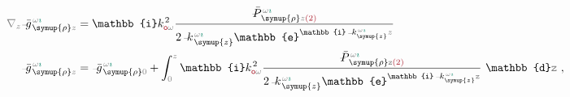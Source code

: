 \begin{subequations} \label{eq:simplify7-LE0-SVA-V_1singular-nokxky-zeta}
\begin{align}
	\mathcolor{gray}{\nabla_z} \xint{{}^{}_{\mathcolor{gray}{-}}}{10}{\bar{g}}^{\;\!\mathcolor{gray}{\omega} \textcolor{PineGreen}{\imath}}_{\;\! \symup{\rho} \mathcolor{gray}{z}} &= \mathbb{i} k_{\textcolor{Maroon}{\mathsf{o}} \mathcolor{gray}{\omega}}^{\;\! 2} \frac{\xint{\mathcolor{gray}{-}}{25}{\bar{P}}^{\;\! \mathcolor{gray}{\omega} \textcolor{PineGreen}{\imath}}_{\;\! \symup{\rho} \mathcolor{gray}{z} \textcolor{Maroon}{(2)}}}{2 \xint{\begin{smallmatrix} ~ \\ {}^{}_{\mathcolor{gray}{-}} \\ ~ \end{smallmatrix}}{15}{k}_{\;\! \symup{z}}^{\;\! \mathcolor{gray}{\omega} \textcolor{PineGreen}{\imath}} \mathbb{e}^{\mathbb{i} \xint{\begin{smallmatrix} ~ \\ {}^{}_{\mathcolor{gray}{-}} \\ ~ \end{smallmatrix}}{15}{k}_{\symup{z}}^{\;\! \mathcolor{gray}{\omega} \textcolor{PineGreen}{\imath}} \mathcolor{gray}{z}}} \label{eq:simplify7-LE0-SVA-V_1singular-nokxky-zeta-g} \\
	\xint{{}^{}_{\mathcolor{gray}{-}}}{10}{\bar{g}}^{\;\!\mathcolor{gray}{\omega} \textcolor{PineGreen}{\imath}}_{\;\! \symup{\rho} \mathcolor{gray}{z}}
	&= \xint{{}^{}_{\mathcolor{gray}{-}}}{10}{\bar{g}}^{\;\!\mathcolor{gray}{\omega} \textcolor{PineGreen}{\imath}}_{\;\! \symup{\rho} \mathcolor{gray}{0}} + \int_{\mathcolor{gray}{0}}^{\mathcolor{gray}{z}} \mathbb{i} k_{\textcolor{Maroon}{\mathsf{o}} \mathcolor{gray}{\omega}}^{\;\! 2} \frac{\xint{\mathcolor{gray}{-}}{25}{\bar{P}}^{\;\! \mathcolor{gray}{\omega} \textcolor{PineGreen}{\imath}}_{\;\! \symup{\rho} \mathcolor{gray}{\mathtt{z}} \textcolor{Maroon}{(2)}}}{2 \xint{\begin{smallmatrix} ~ \\ {}^{}_{\mathcolor{gray}{-}} \\ ~ \end{smallmatrix}}{15}{k}_{\;\! \symup{z}}^{\;\! \mathcolor{gray}{\omega} \textcolor{PineGreen}{\imath}} \mathbb{e}^{\mathbb{i} \xint{\begin{smallmatrix} ~ \\ {}^{}_{\mathcolor{gray}{-}} \\ ~ \end{smallmatrix}}{15}{k}_{\symup{z}}^{\;\! \mathcolor{gray}{\omega} \textcolor{PineGreen}{\imath}} \mathcolor{gray}{\mathtt{z}}}} ~\mathbb{d} \mathcolor{gray}{\mathtt{z}} ~, \label{eq:simplify7-LE0-SVA-V_1singular-nokxky-zeta-solution-g}
\end{align}
\end{subequations}
